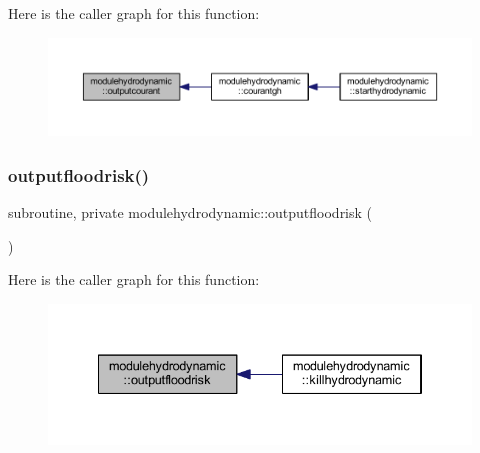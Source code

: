 Here is the caller graph for this function\+:\nopagebreak
\begin{figure}[H]
\begin{center}
\leavevmode
\includegraphics[width=350pt]{namespacemodulehydrodynamic_afd382f82c852a1679b370aaa578e6ce2_icgraph}
\end{center}
\end{figure}
\mbox{\label{namespacemodulehydrodynamic_a98ea84afedb06cff0d55601f6e7b1494}} 
\subsubsection{\texorpdfstring{outputfloodrisk()}{outputfloodrisk()}}
{\footnotesize\ttfamily subroutine, private modulehydrodynamic\+::outputfloodrisk (\begin{DoxyParamCaption}{ }\end{DoxyParamCaption})\hspace{0.3cm}{\ttfamily [private]}}

Here is the caller graph for this function\+:\nopagebreak
\begin{figure}[H]
\begin{center}
\leavevmode
\includegraphics[width=334pt]{namespacemodulehydrodynamic_a98ea84afedb06cff0d55601f6e7b1494_icgraph}
\end{center}
\end{figure}
\mbox{\label{namespacemodulehydrodynamic_a132ea2e90b030b8a52c174eec61093e2}} 
